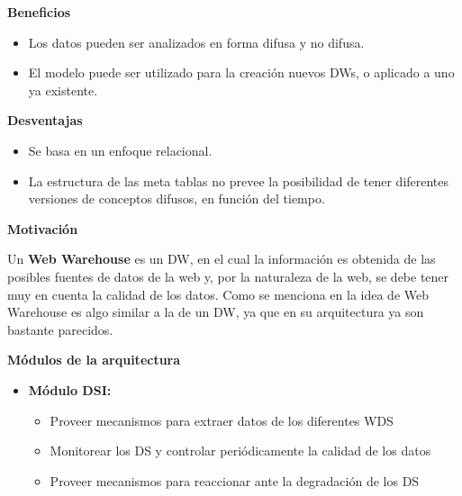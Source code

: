 \documentclass{fancyslides}
\begin{document}
\begin{frame}
\misc
{
\textbf{Beneficios}

\begin{itemize}
  \item \justifying Los datos pueden ser analizados en forma difusa y no difusa.
  \item \justifying El modelo puede ser utilizado para la creación nuevos DWs, o aplicado a uno ya existente.
\end{itemize}

\textbf{Desventajas}

\begin{itemize}
  \item Se basa en un enfoque relacional.
  \item \justifying La estructura de las meta tablas no prevee la posibilidad de tener diferentes versiones de conceptos difusos, en función del tiempo.
\end{itemize}
}

\end{frame}


\begin{frame}
\end{frame}

\begin{frame}
\misc
{ \textbf{Motivación}
\newline

\justifying Un \textbf{Web Warehouse} es un DW, en el cual la información es obtenida de las posibles fuentes de datos de la web y, por la naturaleza de la web, se debe tener muy en cuenta la calidad de los datos. Como se menciona en \cite{WWPaper} la idea de Web Warehouse es algo similar a la de un DW, ya que en su arquitectura ya son bastante parecidos.

}
\end{frame}



\begin{frame}
\end{frame}


\begin{frame}
\misc
{ \textbf{\Large Módulos de la arquitectura}
\newline
\newline

\begin{itemize}
  \item \textbf{Módulo DSI:} 
    \begin{itemize}
      \item Proveer mecanismos para extraer datos de los diferentes WDS
      \item Monitorear los DS y controlar periódicamente la calidad de los datos
      \item Proveer mecanismos para reaccionar ante la degradación de los DS
    \end{itemize}
\end{itemize}

}
\end{frame}
\end{document}

